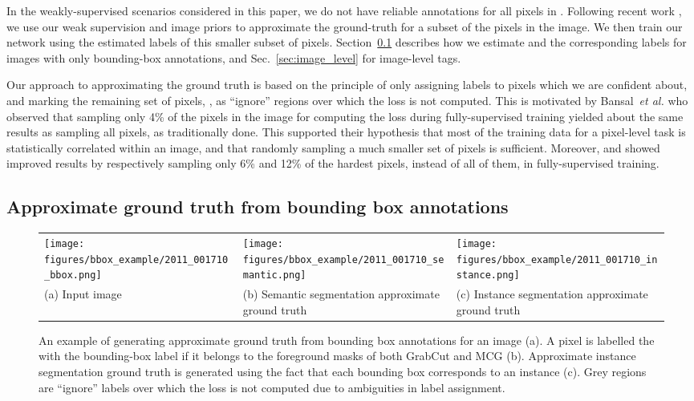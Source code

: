 \documentclass[runningheads]{llncs}
\def\etal{\emph{et al.} }
\begin{document}
In the weakly-supervised scenarios considered in this paper, we do not have reliable annotations for all pixels in .
Following recent work \cite{khoreva_cvpr_2017,kolesnikov_eccv_2016,bearman_arxiv_2015,pathak_iccv_2015}, we use our weak supervision and image priors to approximate the ground-truth for a subset  of the pixels in the image.
We then train our network using the estimated labels of this smaller subset of pixels.
Section~\ref{sec:bounding_box} describes how we estimate  and the corresponding labels for images with only bounding-box annotations, and Sec.~\ref{sec:image_level} for image-level tags.

Our approach to approximating the ground truth is based on the principle of only assigning labels to pixels which we are confident about, and marking the remaining set of pixels, , as ``ignore'' regions over which the loss is not computed.
This is motivated by Bansal~\etal\cite{bansal_arxiv_2017} who observed that sampling only 4\% of the pixels in the image for computing the loss during fully-supervised training yielded about the same results as sampling all pixels, as traditionally done.
This supported their hypothesis that most of the training data for a pixel-level task is statistically correlated within an image, and that randomly sampling a much smaller set of pixels is sufficient. 
Moreover, \cite{pohlen_cvpr_2017} and \cite{li_bmvc_2017} showed improved results by respectively sampling only 6\% and 12\% of the hardest pixels, instead of all of them, in fully-supervised training.

\subsection{Approximate ground truth from bounding box annotations}
\label{sec:bounding_box}
\begin{figure}[!t]
\centering

\begin{tabularx}{\linewidth}{ Y Y Y }
\texttt{[image: figures/bbox\_example/2011\_001710\_bbox.png]} &
\texttt{[image: figures/bbox\_example/2011\_001710\_semantic.png]} &
\texttt{[image: figures/bbox\_example/2011\_001710\_instance.png]}
\\
(a) Input image & (b) Semantic segmentation approximate ground truth & (c) Instance segmentation approximate ground truth
\end{tabularx}
\caption{An example of generating approximate ground truth from bounding box annotations for an image (a). A pixel is labelled the with the bounding-box label if it belongs to the foreground masks of both GrabCut \cite{rother_2004} and MCG \cite{arbelaez_2014} (b). Approximate instance segmentation ground truth is generated using the fact that each bounding box corresponds to an instance (c). Grey regions are ``ignore'' labels over which the loss is not computed due to ambiguities in label assignment.}
\label{fig:bbox_example}

\end{figure}
 
\end{document}
